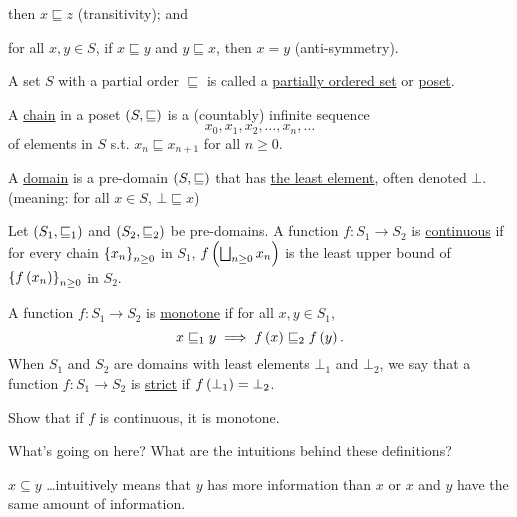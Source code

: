 \begin{enumcirc}
\begin{definition}
\begin{enumrm}
			then $x \sqsubseteq z$ (transitivity); and
			\item
			for all $x, y \in S$, if $x \sqsubseteq y$ and $y \sqsubseteq x$, then $x = y$
			(anti-symmetry).
		\end{enumrm}
		A set $S$ with a partial order $\sqsubseteq$ is called a
		\ul{partially ordered set} or \ul{poset}.
	\end{definition}
	\begin{definition}
		A \ul{chain} in a poset $\left( S, \sqsubseteq \right)$ is a (countably) infinite
		sequence
		\[
			x_0, x_1, x_2, \dots , x_n, \dots
		\]
		of elements in $S$ s.t. $x_n \sqsubseteq x_{n+1}$ for all $n \geq 0$.
	\end{definition}
	\begin{definition}
		A \ul{domain} is a pre-domain $\left( S, \sqsubseteq \right)$ that has
		\ul{the least element}, often denoted $\bot$.
		(meaning: for all $x \in S$, $\bot \sqsubseteq x$)
	\end{definition}
	\begin{definition}
		Let $\left( S_1, \sqsubseteq_1 \right)$ and $\left( S_2, \sqsubseteq_2 \right)$ be
		pre-domains.
		A function $f : S_1 \to S_2$ is \ul{continuous} if for every chain
		$\left\{ x_n \right\}_{n \geq 0}$ in $S_1$,
		$f \left( \bigsqcup_{n \geq 0} x_n \right)$ is the least upper bound of
		$\left\{ f \left( x_n \right) \right\}_{n \geq 0}$ in $S_2$.
	\end{definition}
	\begin{definition}
		A function $f : S_1 \to S_2$ is \ul{monotone} if for all $x, y \in S_1$,
		\[
			x \sqsubseteq_1 y \implies f \left( x \right) \sqsubseteq_2 f \left( y \right).
		\]
		When $S_1$ and $S_2$ are domains with least elements $\bot_1$ and $\bot_2$, we
		say that a function
		$f : S_1 \to S_2$ is \ul{strict} if
		$f \left( \bot_1 \right) = \bot_2$.
	\end{definition}
	\begin{exercise} \label{ex:cont-mon}
		Show that if $f$ is continuous, it is monotone.
	\end{exercise}
	\item
	What's going on here?
	What are the intuitions behind these definitions?
	\begin{enumrm}
		\item
		$x \subseteq y$ \dots intuitively means that $y$ has more information than $x$ or
		$x$ and $y$ have the same amount of information.
		\begin{exampletab}

\end{exampletab}
\end{enumrm}
\end{enumcirc}
